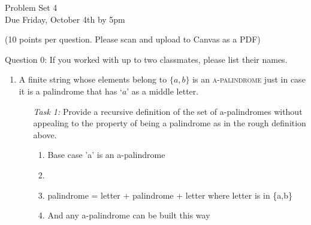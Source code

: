 \documentclass[12pt]{article}
\newcommand{\set}[1]{\lbrace#1\rbrace} %
\newcommand{\answer}[1]{%
  \par\noindent
  \begin{tcolorbox}[colback=gray!10, colframe=gray!80, title=Proof]
    #1
  \end{tcolorbox}
}
\begin{document}
\thispagestyle{empty}

\begin{center}
  \Large Problem Set 4\\[1ex] 
  Due Friday, October 4th by 5pm
  \vspace{.15in}

  \normalsize{(10 points per question. Please scan and upload to Canvas as a PDF)}\\[3ex] 
\end{center}

Question 0: If you worked with up to two classmates, please list their names.\\

\begin{enumerate}
  \item	A finite string whose elements belong to $\set{a,b}$ is an \textsc{a-palindrome} just in case it is a palindrome that has `$a$' as a middle letter.
  \begin{enumerate}[leftmargin=.75in]
    \item[\it Task 1:] Provide a recursive definition of the set of a-palindromes without appealing to the property of being a palindrome as in the rough definition above.
      
      \answer{
        \begin{enumerate}[label=\arabic*.]
          \item Base case 'a' is an a-palindrome
          \item 
          \item palindrome = letter + palindrome + letter where letter is in \{a,b\}
          \item And any a-palindrome can be built this way
        \end{enumerate}
          
      
}
\end{enumerate}
\end{enumerate}
\end{document}
